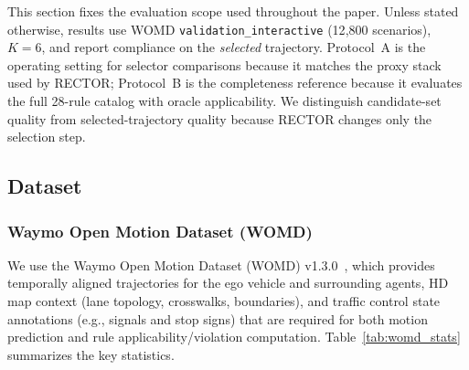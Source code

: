 This section fixes the evaluation scope used throughout the paper. Unless stated otherwise, results use WOMD \texttt{validation\_interactive} (12{,}800 scenarios), $K{=}6$, and report compliance on the \emph{selected} trajectory. Protocol~A is the operating setting for selector comparisons because it matches the proxy stack used by RECTOR; Protocol~B is the completeness reference because it evaluates the full 28-rule catalog with oracle applicability. We distinguish candidate-set quality from selected-trajectory quality because RECTOR changes only the selection step.
\subsection{Dataset}
\label{subsec:dataset}

\subsubsection{Waymo Open Motion Dataset (WOMD)}

We use the Waymo Open Motion Dataset (WOMD) v1.3.0~\cite{WOMD_20201}, which provides temporally aligned trajectories for the ego vehicle and surrounding agents, HD map context (lane topology, crosswalks, boundaries), and traffic control state annotations (e.g., signals and stop signs) that are required for both motion prediction and rule applicability/violation computation. Table~\ref{tab:womd_stats} summarizes the key statistics.

